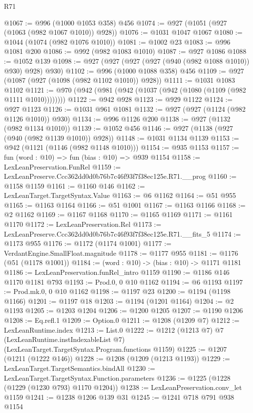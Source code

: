 \begin{lexlean}{R71}
\begin{coremodule}
@1067 := @996 (@1000 @1053 @358) @456
@1074 := @927 (@1051 (@927 (@1063 (@982 @1067 @1010)) @928))
@1076 := @1031 @1047 @1067
@1080 := @1044 (@1074 (@982 @1076 @1010))
@1081 := @1002 @23
@1083 := @996 @1081 @200
@1086 := @992 (@982 @1083 @1010)
@1087 := @927 @1086
@1088 := @1052 @139
@1098 := @927 (@927 (@927 (@927 (@940 (@982 @1088 @1010)) @930) @928) @930)
@1102 := @996 (@1000 @1088 @358) @456
@1109 := @927 (@1087 (@927 (@1098 (@982 @1102 @1010)) @928))
@1111 := @1031 @1083 @1102
@1121 := @970 (@942 (@981 (@942 (@1037 (@942 (@1080 (@1109 (@982 @1111 @1010))))))))
@1122 := @942 @928
@1123 := @929 @1122
@1124 := @927 @1123
@1126 := @1031 @961 @1081
@1132 := @927 (@927 (@1124 (@982 @1126 @1010)) @930)
@1134 := @996 @1126 @200
@1138 := @927 (@1132 (@982 @1134 @1010))
@1139 := @1052 @456
@1146 := @927 (@1138 (@927 (@940 (@982 @1139 @1010)) @928))
@1148 := @1031 @1134 @1139
@1153 := @942 (@1121 (@1146 (@982 @1148 @1010)))
@1154 := @935 @1153
@1157 := fun (word : @10) => fun (bias : @10) => @939 @1154
@1158 := LexLeanPreservation.FunRel
@1159 := LexLeanPreserve.Ccc362dd0d0b76b7c46f93f7f38ec125e.R71.__prog
@1160 := @1158 @1159
@1161 := @1160 @146
@1162 := LexLeanTarget.TargetSyntax.Value
@1163 := @6 @1162
@1164 := @51 @955
@1165 := @1163 @1164
@1166 := @51 @1001
@1167 := @1163 @1166
@1168 := @2 @1162
@1169 := @1167 @1168
@1170 := @1165 @1169
@1171 := @1161 @1170
@1172 := LexLeanPreservation.Rel
@1173 := LexLeanPreserve.Ccc362dd0d0b76b7c46f93f7f38ec125e.R71.__fits_5
@1174 := @1173 @955
@1176 := @1172 (@1174 @1001)
@1177 := VerdantEngine.SmallFloat.magnitude
@1178 := @1177 @955
@1181 := @1176 (@51 (@1178 @1001))
@1184 := (word : @10) -> (bias : @10) -> @1171 @1181
@1186 := LexLeanPreservation.funRel_intro @1159
@1190 := @1186 @146 @1170 @1181 @793
@1193 := Prod.{0, 0} @10 @1162
@1194 := @6 @1193
@1197 := Prod.mk.{0, 0} @10 @1162
@1198 := @1197 @23
@1200 := @1194 (@1198 @1166)
@1201 := @1197 @18
@1203 := @1194 (@1201 @1164)
@1204 := @2 @1193
@1205 := @1203 @1204
@1206 := @1200 @1205
@1207 := @1190 @1206
@1208 := Eq.refl.{1}
@1209 := Option.{0}
@1211 := @1208 (@1209 @7)
@1212 := LexLeanRuntime.index
@1213 := List.{0}
@1222 := @1212
    (@1213 @7)
    @7
    (LexLeanRuntime.instIndexableList @7)
    (LexLeanTarget.TargetSyntax.Program.functions @1159)
@1225 := @1207 (@1211 (@1222 @146))
@1228 := @1208 (@1209 (@1213 @1193))
@1229 := LexLeanTarget.TargetSemantics.bindAll
@1230 := LexLeanTarget.TargetSyntax.Function.parameters
@1236 := @1225 (@1228 (@1229 (@1230 @793) @1170 @1204))
@1238 := LexLeanPreservation.conv_let @1159
@1241 := @1238 @1206 @139 @31
@1245 := @1241 @718 @791 @938 @1154

\end{coremodule}
\end{lexlean}
